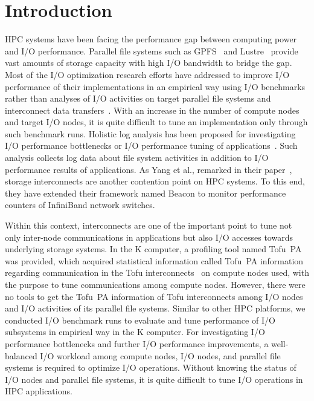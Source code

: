 \documentclass{jhps}
\begin{document}
\section{Introduction}
\label{sec:INTRO}

HPC systems have been facing the performance gap between computing power and I/O performance.
Parallel file systems such as GPFS~\cite{gpfs:usenix02} and Lustre~\cite{lustre:web} provide
vast amounts of storage capacity with high I/O bandwidth to bridge the gap.
Most of the I/O optimization research efforts have addressed to improve
I/O performance of their implementations in an empirical way using I/O benchmarks
rather than analyses of I/O activities on target parallel file systems
and interconnect
data transfers~\cite{behzad:sc13,bhimji:cug16,tessier:com-hpc16,vazhkudai:sc18,oral:sc19}.
With an increase in the number of compute nodes and target I/O nodes,
it is quite difficult to tune an implementation only through such benchmark runs.
Holistic log analysis has been proposed for investigating I/O performance bottlenecks
or I/O performance tuning
of applications~\cite{lockwood:cug18,wang:cluster18,yang:nsdi2019}.
Such analysis collects log data about file system activities in addition to
I/O performance results of applications.
As Yang et al., remarked in their paper~\cite{yang:nsdi2019},
storage interconnects are another contention point on HPC systems.
To this end, they have extended their framework named Beacon
to monitor performance counters of InfiniBand network switches.

Within this context, interconnects are one of the important point
to tune not only inter-node communications in applications
but also I/O accesses towards underlying storage systems.
In the K computer, a profiling tool named Tofu~PA~\cite{profiler:fujitsu-tech-si}
was provided, which acquired statistical information called Tofu~PA information
regarding communication in the Tofu interconnects~\cite{tofu:micro2012}
on compute nodes used, with the purpose to tune communications among compute nodes.
However, there were no tools to get the Tofu~PA information of Tofu interconnects
among I/O nodes and I/O activities of its parallel file systems.
Similar to other HPC platforms, we conducted I/O benchmark runs
to evaluate and tune performance of I/O subsystems in empirical way
in the K computer.
For investigating I/O performance bottlenecks and further I/O performance improvements,
a well-balanced I/O workload among compute nodes, I/O nodes, and parallel file systems
is required to optimize I/O operations.
Without knowing the status of I/O nodes and parallel file systems,
it is quite difficult to tune I/O operations in HPC applications.
\end{document}

